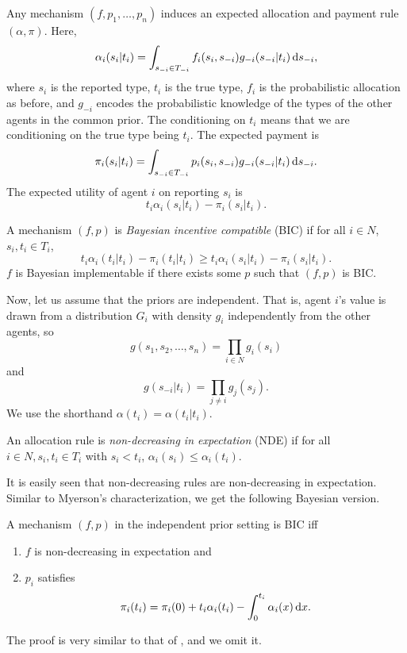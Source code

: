 		Any mechanism $(f,p_1,\ldots,p_n)$ induces an expected allocation and payment rule $(\alpha,\pi)$. Here,
		\[ \alpha_i(s_i | t_i) = \int_{s_{-i} \in T_{-i}} f_i(s_i,s_{-i}) g_{-i}(s_{-i}| t_i) \dif s_{-i}, \]
		where $s_i$ is the reported type, $t_i$ is the true type, $f_i$ is the probabilistic allocation as before, and $g_{-i}$ encodes the probabilistic knowledge of the types of the other agents in the common prior. The conditioning on $t_i$ means that we are conditioning on the true type being $t_i$. The expected payment is
		\[ \pi_i(s_i| t_i) = \int_{s_{-i} \in T_{-i}} p_i(s_i,s_{-i}) g_{-i}(s_{-i} | t_i) \dif s_{-i}. \]
		The expected utility of agent $i$ on reporting $s_i$ is
		\[ t_i \alpha_i(s_i | t_i) - \pi_i(s_i | t_i). \]

		\begin{fdef}
			A mechanism $(f,p)$ is \emph{Bayesian incentive compatible} (BIC) if for all $i \in N$, $s_i,t_i \in T_i$,
			\[ t_i \alpha_i(t_i | t_i) - \pi_i(t_i | t_i) \ge t_i \alpha_i(s_i | t_i) - \pi_i(s_i | t_i). \]
			$f$ is Bayesian implementable if there exists some $p$ such that $(f,p)$ is BIC.
		\end{fdef}
		Now, let us assume that the priors are independent. That is, agent $i$'s value is drawn from a distribution $G_i$ with density $g_i$ independently from the other agents, so
		\[ g(s_1,s_2,\ldots,s_n) = \prod_{i \in N} g_i(s_i) \]
		and
		\[ g(s_{-i} | t_i) = \prod_{j \ne i} g_j(s_j). \]
		We use the shorthand $\alpha(t_i) = \alpha(t_i | t_i)$.

		\begin{fdef}
			An allocation rule is \emph{non-decreasing in expectation} (NDE) if for all $i \in N, s_i,t_i \in T_i$ with $s_i < t_i$, $\alpha_i(s_i) \le \alpha_i(t_i)$.
		\end{fdef}
		It is easily seen that non-decreasing rules are non-decreasing in expectation.\\
		Similar to Myerson's characterization, we get the following Bayesian version.

		\begin{ftheo}
			\label{bic char}
			A mechanism $(f,p)$ in the independent prior setting is BIC iff
			\begin{enumerate}
				\item $f$ is non-decreasing in expectation and
				\item $p_i$ satisfies
				\[ \pi_i(t_i) = \pi_i(0) + t_i \alpha_i(t_i) - \int_0^{t_i} \alpha_i(x) \dif x. \]
			\end{enumerate}
		\end{ftheo}
		The proof is very similar to that of , and we omit it.

